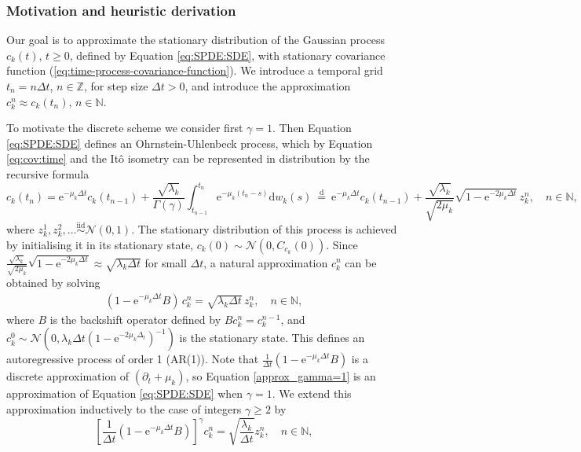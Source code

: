 \documentclass[12pt]{article} %
\begin{document}
\subsubsection{Motivation and heuristic derivation}

Our goal is to approximate the stationary distribution %
of the Gaussian process $c_k(t)$, $t \geq 0$, defined by Equation \eqref{eq:SPDE:SDE}, with stationary covariance function (\ref{eq:time-process-covariance-function}). We introduce a temporal grid $t_n = n \Delta t$, $n \in \mathbb Z$, for step size $\Delta t>0$, and introduce the approximation 
 $c_k^n\approx c_k(t_n)$, $n \in \mathbb N$. 
 
To motivate the discrete scheme we consider first $\gamma = 1$. Then Equation \eqref{eq:SPDE:SDE} defines an Ohrnstein-Uhlenbeck process, which by Equation \eqref{eq:cov:time} and the Itô isometry can be represented in distribution by the recursive formula
$$
    c_k(t_{n}) = \mathrm{e}^{-\mu_k\Delta t}c_k(t_{n-1})+\frac{\sqrt{\lambda_k}}{\Gamma(\gamma)} \int_{t_{n-1}}^{t_{n}} \mathrm{e}^{-\mu_k (t_n-s)} \text{d} w_k(s) \
    { \overset{\mathrm{d}}{=} } \ \mathrm{e}^{-\mu_k\Delta t}c_k(t_{n-1}) + \frac{\sqrt{\lambda_k}}{\sqrt{2\mu_k}}\sqrt{1-\mathrm{e}^{-2\mu_k\Delta t}}\, z_k^n , \quad n\in\mathbb{N},$$
%
where $z_k^1, z_k^2,\ldots \overset{\text{iid}}{\sim} \mathcal{N}(0,1)$. The stationary distribution of this process is achieved by initialising it in its stationary state, $c_k(0)\sim \mathcal{N}(0, C_{c_k}(0))$.
Since  $\frac{\sqrt{\lambda_k}}{\sqrt{2\mu_k}}\sqrt{1-\mathrm{e}^{-2\mu_k\Delta t}} \approx \sqrt{\lambda_k \Delta t}$ for small $\Delta t$,  a natural approximation $c_k^n$ can be obtained by solving
\begin{align}\label{approx_gamma=1}
    (1-\mathrm{e}^{-\mu_k\Delta t}B)\,c_k^n = 
    { \sqrt{\lambda_k \Delta t} }\, z_k^n, \quad n\in\mathbb{N},
\end{align}
where $B$ is the backshift operator defined by
$Bc_k^n = c_k^{n-1}$, and $c_k^0 \sim\mathcal{N}(0,\lambda_k\Delta t(1-\mathrm{e}^{-2\mu_k\Delta_t})^{-1})$ is the stationary state. This defines an autoregressive process of order 1 (AR(1)). Note that $\frac1{\Delta t}(1-\mathrm{e}^{-\mu_k\Delta t}B)$ is a discrete approximation of $(\partial_t + \mu_k)$, so Equation \eqref{approx_gamma=1} is an approximation of Equation \eqref{eq:SPDE:SDE} when $\gamma=1$. We extend this approximation  inductively to the case of integers $\gamma \geq 2$ by 
\[
    \left[\frac{1}{\Delta t}(1-\mathrm{e}^{-\mu_k\Delta t}B) \right]^\gamma c_k^{n} = \sqrt{\frac{\lambda_k}{\Delta t}}z_k^n, \quad n\in\mathbb{N},
\]
\end{document}
